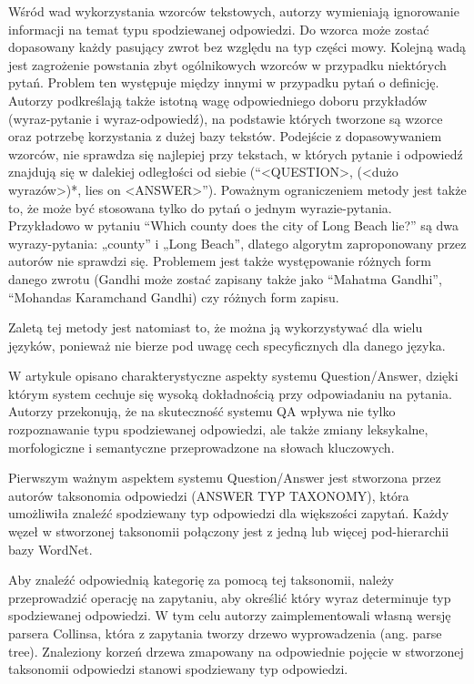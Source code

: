 Wśród wad wykorzystania wzorców tekstowych, autorzy wymieniają ignorowanie informacji na temat typu spodziewanej odpowiedzi. Do wzorca może zostać dopasowany każdy pasujący zwrot bez względu na typ części mowy. Kolejną wadą jest zagrożenie powstania zbyt ogólnikowych wzorców w przypadku niektórych pytań. Problem ten występuje między innymi w przypadku pytań o definicję. Autorzy podkreślają także istotną wagę odpowiedniego doboru przykładów (wyraz-pytanie i wyraz-odpowiedź), na podstawie których tworzone są wzorce oraz potrzebę korzystania z dużej bazy tekstów. Podejście z dopasowywaniem wzorców, nie sprawdza się najlepiej przy tekstach, w których pytanie i odpowiedź znajdują się w dalekiej odległości od siebie (“<QUESTION>, (<dużo wyrazów>)*, lies on <ANSWER>”). Poważnym ograniczeniem metody jest także to, że może być stosowana tylko do pytań o jednym wyrazie-pytania. Przykładowo w pytaniu “Which county does the city of Long Beach lie?” są dwa wyrazy-pytania: „county” i „Long Beach”, dlatego algorytm zaproponowany przez autorów nie sprawdzi się. Problemem jest także występowanie różnych form danego zwrotu (Gandhi może zostać zapisany także jako “Mahatma Gandhi”, “Mohandas Karamchand Gandhi) czy różnych form zapisu. 

Zaletą tej metody jest natomiast to, że można ją wykorzystywać dla wielu języków, ponieważ nie bierze pod uwagę cech specyficznych dla danego języka\cite{ravichandran-hovy-2002-learning}.

W artykule \cite{hpqa} opisano charakterystyczne aspekty systemu Question/Answer, dzięki którym system cechuje się wysoką dokładnością przy odpowiadaniu na pytania. Autorzy przekonują, że na skuteczność systemu QA wpływa nie tylko rozpoznawanie typu spodziewanej odpowiedzi, ale także zmiany leksykalne, morfologiczne i semantyczne przeprowadzone na słowach kluczowych.

Pierwszym ważnym aspektem systemu Question/Answer jest stworzona przez autorów taksonomia odpowiedzi (ANSWER TYP TAXONOMY), która umożliwiła znaleźć spodziewany typ odpowiedzi dla większości zapytań. Każdy węzeł w stworzonej taksonomii połączony jest z jedną lub więcej pod-hierarchii bazy WordNet. 

Aby znaleźć odpowiednią kategorię za pomocą tej taksonomii, należy przeprowadzić operację na zapytaniu, aby określić który wyraz determinuje typ spodziewanej odpowiedzi. W tym celu autorzy zaimplementowali własną wersję parsera Collinsa, która z zapytania tworzy drzewo wyprowadzenia (ang. parse tree). Znaleziony korzeń drzewa zmapowany na odpowiednie pojęcie w stworzonej taksonomii odpowiedzi stanowi spodziewany typ odpowiedzi. 

